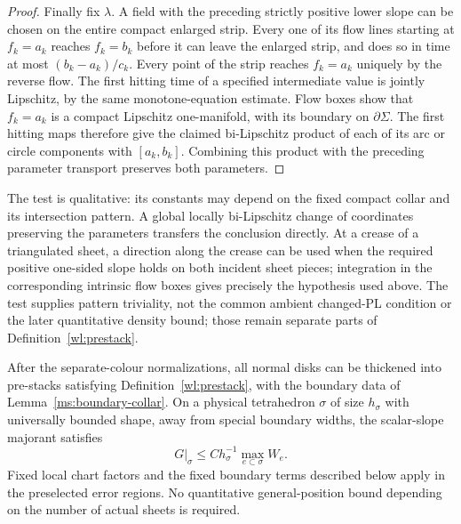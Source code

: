 \begin{proof}
Finally fix $\lambda$.  A field with the preceding strictly positive
lower slope can be chosen on the entire compact enlarged strip.
Every one of its flow lines starting at $f_k=a_k$ reaches
$f_k=b_k$ before it can leave the enlarged strip, and does so in
time at most $(b_k-a_k)/c_k$.  Every point of the strip reaches
$f_k=a_k$ uniquely by the reverse flow.  The first hitting time
of a specified intermediate value is jointly Lipschitz, by the same
monotone-equation estimate.  Flow boxes show that $f_k=a_k$ is a
compact Lipschitz one-manifold, with its boundary on
$\partial\Sigma$.  The first hitting maps therefore give the
claimed bi-Lipschitz product of each of its arc or circle components
with $[a_k,b_k]$.  Combining this product with the preceding
parameter transport preserves both parameters.
\end{proof}

\begin{remark}
The test is qualitative: its constants may depend on the fixed
compact collar and its intersection pattern.  A global locally
bi-Lipschitz change of coordinates preserving the parameters transfers
the conclusion directly.  At a crease of a triangulated sheet, a
direction along the crease can be used when the required positive
one-sided slope holds on both incident sheet pieces; integration in
the corresponding intrinsic flow boxes gives precisely the hypothesis
used above.  The test supplies pattern triviality, not the common
ambient changed-PL condition or the later quantitative density bound;
those remain separate parts of Definition~\ref{wl:prestack}.
\end{remark}

\begin{lemma}
\label{ms:weak-templates}
After the separate-colour normalizations, all normal disks can be
thickened into pre-stacks satisfying Definition~\ref{wl:prestack}, with the
boundary data of Lemma~\ref{ms:boundary-collar}.  On a physical tetrahedron
$\sigma$ of size $h_\sigma$ with universally bounded shape, away
from special boundary widths, the scalar-slope majorant satisfies
\begin{equation}
 G|_\sigma\le C h_\sigma^{-1}
                    \max_{e\subset\sigma} W_e.
 \label{ms:weak-G}
\end{equation}
Fixed local chart factors and the fixed boundary terms described
below apply in the preselected error regions.  No quantitative
general-position bound depending on the number of actual sheets is
required.
\end{lemma}

